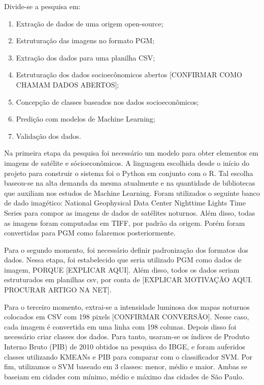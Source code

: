 \documentclass[]{article}
\begin{document}
Divide-se a pesquisa em:
\begin{enumerate}
	
	\item Extração de dados de uma origem open-source;
	
	\item Estruturação das imagens no formato PGM;
	
	\item Extração dos dados para uma planilha CSV;
	
	\item Estruturação dos dados socioecônomicos abertos [CONFIRMAR COMO CHAMAM DADOS ABERTOS];
	
	\item Concepção de classes baseados nos dados socioeconômicos;
	
	\item Predição com modelos de Machine Learning;
	
	\item Validação dos dados.
	
\end{enumerate}

Na primeira etapa da pesquisa foi necessário um modelo para obter elementos em imagens de satélite e sócioeconômicos. A linguagem escolhida desde o início do projeto para construir o sistema foi o Python em conjunto com o R. Tal escolha baseou-se na alta demanda da mesma atualmente e na quantidade de bibliotecas que auxiliam nos estudos de Machine Learning. Foram utilizados o seguinte banco de dado imagético: National Geophysical Data Center Nighttime Lights Time Series para compor as imagens de dados de satélites noturnos. Além disso, todas as imagens foram computadas em TIFF, por padrão da origem. Porém foram convertidas para PGM como falaremos posteriormente.

Para o segundo momento, foi necessário definir padronização dos formatos dos dados. Nessa etapa, foi estabelecido que seria utilizado PGM como dados de imagem, PORQUE [EXPLICAR AQUI]. Além disso, todos os dados seriam estruturados em planilhas csv, por conta de [EXPLICAR MOTIVAÇÃO AQUI. PROCURAR ARTIGO NA NET].

Para o terceiro momento, extrai-se a intensidade luminosa dos mapas noturnos colocados em CSV com 198 pixels [CONFIRMAR CONVERSÃO]. Nesse caso, cada imagem é convertida em uma linha com 198 colunas. Depois disso foi necessário criar classes dos dados. Para tanto, usaram-se os índices de Produto Interno Bruto (PIB) de 2010 obtidos na pesquisa do IBGE, e foram auferidos classes utilizando KMEANs e PIB para comparar com o classificador SVM.
Por fim, utilizamos o SVM baseado em 3 classes: menor, médio e maior. Ambas se baseiam em cidades com mínimo, médio e máximo das cidades de São Paulo.
\end{document}

